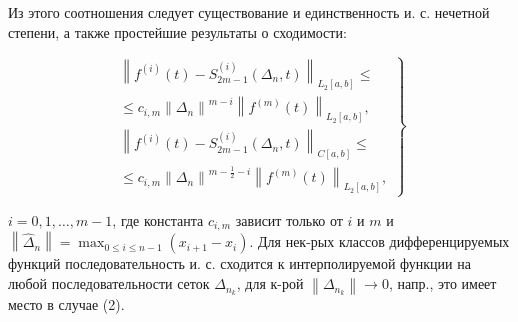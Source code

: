 \documentclass[10pt]{article}
\begin{document}
Из этого соотношения следует существование и единственность и. с. нечетной степени, а также простейшие результаты о сходимости:



\[

\left.\begin{array}{c}

\left\|f^{(i)}(t)-S_{2 m-1}^{(i)}\left(\Delta_{n}, t\right)\right\|_{L_{2}[a, b]} \leqslant \\

\leqslant c_{i, m}\left\|\Delta_{n}\right\|^{m-i}\left\|f^{(m)}(t)\right\|_{L_{2}[a, b]}, \\

\left\|f^{(i)}(t)-S_{2 m-1}^{(i)}\left(\Delta_{n}, t\right)\right\|_{C[a, b]} \leqslant \\

\leqslant c_{i, m}\left\|\Delta_{n}\right\|^{m-\frac{1}{2}-i}\left\|f^{(m)}(t)\right\|_{L_{2}[a, b]},

\end{array}\right\}

\]



$i=0,1, \ldots, m-1$, где константа $c_{i, m}$ зависит только от $i$ и $m$ и $\left\|\widehat{\Delta}_{n}\right\|=\max _{0 \leqslant i \leqslant n-1}\left(x_{i+1}-x_{i}\right)$. Для нек-рых классов дифференцируемых функций последовательность и. с. сходится к интерполируемой функции на любой последовательности сеток $\Delta_{n_{k}}$, для к-рой $\left\|\Delta_{n_{k}}\right\| \rightarrow 0$, напр., это имеет место в случае (2).
\end{document}
